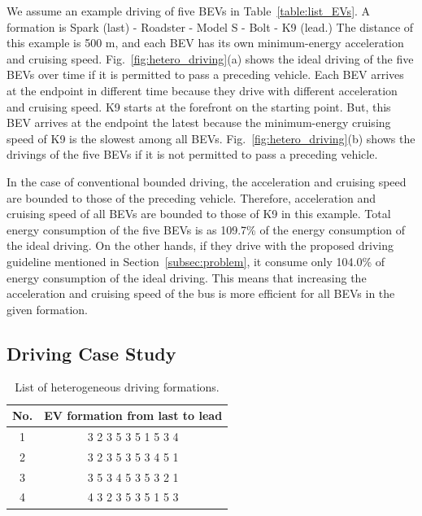 \documentclass{IEEEtran}
\begin{document}
We assume an example driving of five BEVs in Table~\ref{table:list_EVs}. A formation is Spark (last) - Roadster - Model S - Bolt - K9 (lead.)
The distance of this example is 500 m, and each BEV has its own minimum-energy acceleration and cruising speed. 
Fig.~\ref{fig:hetero_driving}(a) shows the ideal driving of the five BEVs over time if it is permitted to pass a preceding vehicle.  
Each BEV arrives at the endpoint in different time because they drive with different acceleration and cruising speed.
K9 starts at the forefront on the starting point. But, this BEV arrives at the endpoint the latest because the minimum-energy cruising speed of K9 is the slowest among all BEVs.
Fig.~\ref{fig:hetero_driving}(b) shows the drivings of the five BEVs if it is not permitted to pass a preceding vehicle. 

In the case of conventional bounded driving, the acceleration and cruising speed are bounded to those of the preceding vehicle. Therefore, acceleration and cruising speed of all BEVs are bounded to those of K9 in this example. Total energy consumption of the five BEVs is as 109.7\% of the energy consumption of the ideal driving.
On the other hands, if they drive with the proposed driving guideline mentioned in Section~\ref{subsec:problem}, it consume only 104.0\% of energy consumption of the ideal driving.
This means that increasing the acceleration and cruising speed of the bus is more efficient for all BEVs in the given formation.

\subsection{Driving Case Study}

\begin{table} 	%
\centering
\small
\caption{List of heterogeneous driving formations.}
\label{table:list_formation}
\begin{tabular}{|c|c|} \hline
No.	&EV formation from last to lead	\\ \hline
1	&3 2 3 5 3 5 1 5 3 4	\\ \hline
2	&3 2 3 5 3 5 3 4 5 1	\\ \hline
3	&3 5 3 4 5 3 5 3 2 1	\\ \hline
4	&4 3 2 3 5 3 5 1 5 3	\\ \hline
\end{tabular}
\end{table}
\end{document}
